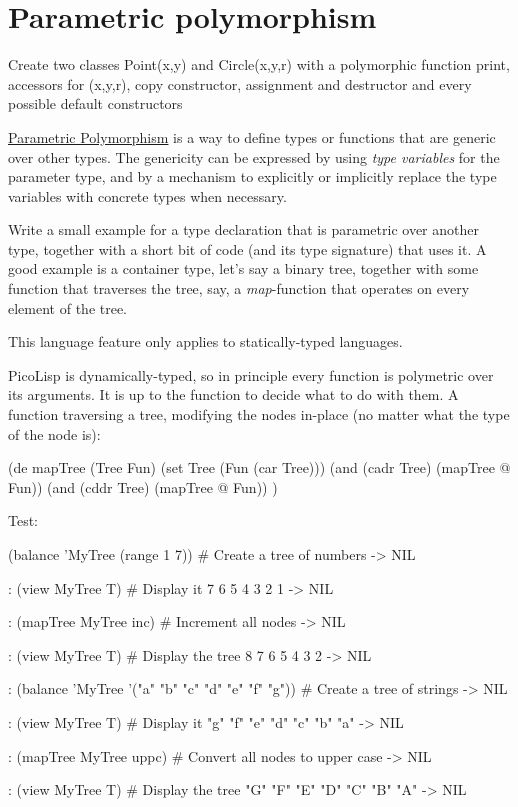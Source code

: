 \pagebreak{}
\section*{Parametric polymorphism}

Create two classes Point(x,y) and Circle(x,y,r) with a polymorphic
function print, accessors for (x,y,r), copy constructor, assignment and
destructor and every possible default constructors

\href{http://en.wikipedia.org/wiki/Parametric\_Polymorphism}{Parametric
Polymorphism} is a way to define types or functions that are generic
over other types. The genericity can be expressed by using \emph{type
variables} for the parameter type, and by a mechanism to explicitly or
implicitly replace the type variables with concrete types when
necessary.

Write a small example for a type declaration that is parametric over
another type, together with a short bit of code (and its type signature)
that uses it. A good example is a container type, let's say a binary
tree, together with some function that traverses the tree, say, a
\emph{map}-function that operates on every element of the tree.

This language feature only applies to statically-typed languages.

\begin{wideverbatim}

PicoLisp is dynamically-typed, so in principle every function is polymetric over
its arguments. It is up to the function to decide what to do with them. A
function traversing a tree, modifying the nodes in-place (no matter what the
type of the node is):

(de mapTree (Tree Fun)
   (set Tree (Fun (car Tree)))
   (and (cadr Tree) (mapTree @ Fun))
   (and (cddr Tree) (mapTree @ Fun)) )

Test:

(balance 'MyTree (range 1 7))          # Create a tree of numbers
-> NIL

: (view MyTree T)                      # Display it
      7
   6
      5
4
      3
   2
      1
-> NIL


: (mapTree MyTree inc)                 # Increment all nodes
-> NIL

: (view MyTree T)                      # Display the tree
      8
   7
      6
5
      4
   3
      2
-> NIL

\end{wideverbatim}

\begin{wideverbatim}

: (balance 'MyTree '("a" "b" "c" "d" "e" "f" "g"))  # Create a tree of strings
-> NIL

: (view MyTree T)                      # Display it
      "g"
   "f"
      "e"
"d"
      "c"
   "b"
      "a"
-> NIL

: (mapTree MyTree uppc)                # Convert all nodes to upper case
-> NIL

: (view MyTree T)                      # Display the tree
      "G"
   "F"
      "E"
"D"
      "C"
   "B"
      "A"
-> NIL

\end{wideverbatim}

